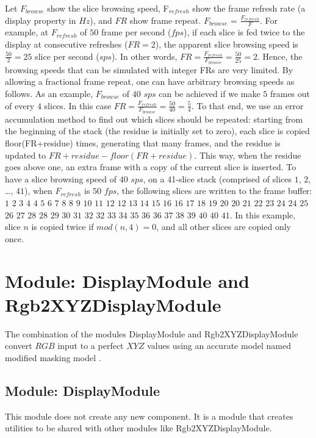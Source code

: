 Let $F_{browse}$ show the slice browsing speed, F$_{refresh}$ show the frame refresh rate (a display property in $Hz$), and $FR$ show frame repeat. $F_{browse}$ = $\frac{F_{refresh}}{F}$. For example, at $F_{refresh}$ of $50$ frame per second ($fps$), if each slice is fed twice to the display at consecutive refreshes ($FR = 2$), the apparent slice browsing speed is $\frac{50}{2} = 25$ slice per second ($sps$). In other words, $FR = \frac{F_{refresh}}{F_{browse}} = \frac{50}{25} = 2$. Hence, the browsing speeds that can be simulated with integer FRs are very limited. By allowing a fractional frame repeat, one can have arbitrary browsing speeds as follows. As an example, $F_{browse}$ of $40$ $sps$ can be achieved if we make $5$ frames out of every $4$ slices. In this case $FR = \frac{F_{refresh}}{F_{browse}} = \frac{50}{40} = \frac{5}{4}$. To that end, we use an error accumulation method to find out which slices should be repeated: starting from the beginning of the stack (the residue is initially set to zero), each slice is copied floor(FR+residue) times, generating that many frames, and the residue is updated to $FR+residue-floor(FR+residue)$. This way, when the residue goes above one, an extra frame with a copy of the current slice is inserted. To have a slice browsing speed of $40$ $sps$, on a 41-slice stack (comprised of slices $1$, $2$, \ldots{}, $41$), when $F_{refresh}$ is $50$ $fps$, the following slices are written to the frame buffer: $1$ $2$ $3$ $4$ $4$ $5$ $6$ $7$ $8$ $8$ $9$ $10$ $11$ $12$ $12$ $13$ $14$ $15$ $16$ $16$ $17$ $18$ $19$ $20$ $20$ $21$ $22$ $23$ $24$ $24$ $25$ $26$ $27$ $28$ $28$ $29$ $30$ $31$ $32$ $32$ $33$ $34$ $35$ $36$ $36$ $37$ $38$ $39$ $40$ $40$ $41$. In this example, slice $n$ is copied twice if $mod(n, 4) = 0$, and all other slices are copied only once.

\section{Module: DisplayModule and Rgb2XYZDisplayModule}

The combination of the modules DisplayModule and Rgb2XYZDisplayModule convert $RGB$ input to a perfect $XYZ$ values using an accurate model named modified masking model \cite{Tam02}.

\subsection{Module: DisplayModule}

This module does not create any new component. It is a module that creates utilities to be shared with other modules like Rgb2XYZDisplayModule.

